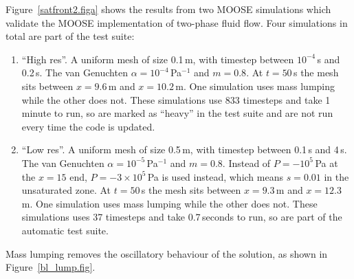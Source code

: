 \documentclass[]{scrreprt}
\begin{document}
Figure~\ref{satfront2.figa} shows the results from two MOOSE
simulations which validate the MOOSE implementation of two-phase fluid
flow.  Four simulations in total are part of the test suite:
\begin{enumerate}
\item ``High res''.  A uniform mesh of size 0.1\,m, with timestep between
  $10^{-4}$\,s and 0.2\,s.  The van Genuchten
  $\alpha=10^{-4}$\,Pa$^{-1}$ and $m=0.8$.  At $t=50$\,s the mesh sits
  between $x=9.6$\,m and $x=10.2$\,m.  One simulation uses mass
  lumping while the other does not.  These simulations use 833
  timesteps and take 1\,minute
  to run, so are marked as ``heavy'' in the test suite and are not run
  every time the code is updated.
\item ``Low res''.  A uniform mesh of size 0.5\,m, with timestep between 0.1\,s and
  4\,s.  The van Genuchten 
  $\alpha=10^{-5}$\,Pa$^{-1}$ and $m=0.8$.  Instead of $P=-10^{5}$\,Pa
  at the $x=15$ end, $P=-3\times 10^{5}$\,Pa is used instead, which
  means $s=0.01$ in the unsaturated zone.  At $t=50$\,s the mesh sits
  between $x=9.3$\,m and $x=12.3$\,m.  One simulation uses mass
  lumping while the other does not.  These simulations uses 37
  timesteps and take 0.7\,seconds to run, so are part of the automatic
  test suite.
\end{enumerate}
Mass lumping removes the oscillatory behaviour of the solution, as
shown in Figure~\ref{bl_lump.fig}.
\end{document}
